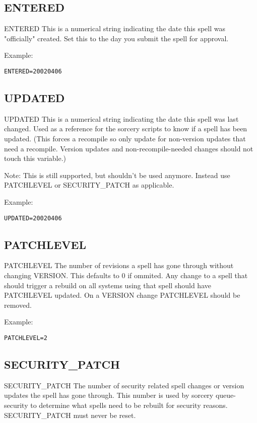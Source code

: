 \documentclass[a4paper,10pt]{book}
\begin{document}
\subsection{ENTERED}
ENTERED
	This is a numerical string indicating the date this spell was
	"officially" created. Set this to the day you submit the spell for
	approval.

Example:
\begin{verbatim}
ENTERED=20020406
\end{verbatim}

\subsection{UPDATED}
UPDATED
	This is a numerical string indicating the date this spell was last
	changed. Used as a reference for the sorcery scripts to know if a
	spell has been updated. (This forces a recompile so only update for
	non-version updates that need a recompile. Version updates and
	non-recompile-needed changes should not touch this variable.)

Note: This is still supported, but shouldn't be used anymore. Instead use
PATCHLEVEL or SECURITY\_PATCH as applicable.

Example:
\begin{verbatim}
UPDATED=20020406
\end{verbatim}

\subsection{PATCHLEVEL}
PATCHLEVEL
	The number of revisions a spell has gone through without changing
	VERSION. This defaults to 0 if ommited. Any change to a spell that
	should trigger a rebuild on all systems using that spell should have
	PATCHLEVEL updated. On a VERSION change PATCHLEVEL should be removed.

Example:
\begin{verbatim}
PATCHLEVEL=2
\end{verbatim}

\subsection{SECURITY\_PATCH}
SECURITY\_PATCH
	The number of security related spell changes or version updates the
	spell has gone through. This number is used by sorcery queue-security
	to determine what spells need to be rebuilt for security reasons.
	SECURITY\_PATCH must never be reset.
\end{document}
